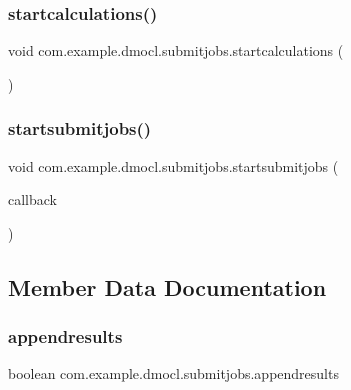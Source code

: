 \subsubsection{\texorpdfstring{startcalculations()}{startcalculations()}}
{\footnotesize\ttfamily void com.\+example.\+dmocl.\+submitjobs.\+startcalculations (\begin{DoxyParamCaption}{ }\end{DoxyParamCaption})\hspace{0.3cm}{\ttfamily [inline]}}

\mbox{\label{classcom_1_1example_1_1dmocl_1_1submitjobs_ac1d6ef36ed662cda753e0d884b596a04}} 
\subsubsection{\texorpdfstring{startsubmitjobs()}{startsubmitjobs()}}
{\footnotesize\ttfamily void com.\+example.\+dmocl.\+submitjobs.\+startsubmitjobs (\begin{DoxyParamCaption}\item[{final \mbox{\hyperlink{interfacecom_1_1example_1_1dmocl_1_1RepositoryCallback}{Repository\+Callback}}$<$ \mbox{\hyperlink{classcom_1_1example_1_1dmocl_1_1immediatejobs_1_1jobschedresponse}{jobschedresponse}} $>$}]{callback }\end{DoxyParamCaption})\hspace{0.3cm}{\ttfamily [inline]}}



\subsection{Member Data Documentation}
\mbox{\label{classcom_1_1example_1_1dmocl_1_1submitjobs_a42dadeb403b8e36690f79c57bb5deb4a}} 
\subsubsection{\texorpdfstring{appendresults}{appendresults}}
{\footnotesize\ttfamily boolean com.\+example.\+dmocl.\+submitjobs.\+appendresults\hspace{0.3cm}{\ttfamily [private]}}

